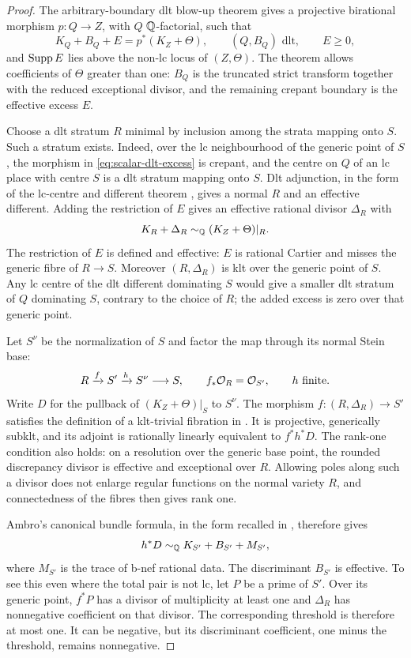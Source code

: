 \begin{proof}
The arbitrary-boundary dlt blow-up theorem
\cite[Theorem~2.10]{FujinoHashizume} gives a projective birational morphism
$p:Q\to Z$, with $Q$ $\mathbb Q$-factorial, such that
\begin{equation}\label{eq:scalar-dlt-excess}
 K_Q+B_Q+E=p^*(K_Z+\Theta),
 \qquad (Q,B_Q)\text{ dlt},\qquad E\ge0,
\end{equation}
and $\operatorname{Supp} E$ lies above the non-lc locus of $(Z,\Theta)$.
The theorem allows coefficients of $\Theta$ greater than one: $B_Q$ is
the truncated strict transform together with the reduced exceptional
divisor, and the remaining crepant boundary is the effective excess $E$.

Choose a dlt stratum $R$ minimal by inclusion among the strata mapping
onto $S$.  Such a stratum exists.  Indeed, over the lc neighbourhood of
the generic point of $S$, the morphism in
\eqref{eq:scalar-dlt-excess} is crepant, and the centre on $Q$ of an lc
place with centre $S$ is a dlt stratum mapping onto $S$.
Dlt adjunction, in the form of the lc-centre and different theorem
\cite[4.16]{Kollar2013}, gives a normal $R$ and an effective
different.  Adding the restriction of $E$ gives an effective rational
divisor $\Delta_R$ with
\[
 K_R+\Delta_R\sim_{\mathbb Q}(K_Z+\Theta)|_R.
\]
The restriction of $E$ is defined and effective: $E$ is rational Cartier
and misses the generic fibre of $R\to S$.  Moreover $(R,\Delta_R)$ is
klt over the generic point of $S$.  Any lc centre of the dlt different
dominating $S$ would give a smaller dlt stratum of $Q$ dominating $S$,
contrary to the choice of $R$; the added excess is zero over that generic
point.

Let $S^\nu$ be the normalization of $S$ and factor the map through its
normal Stein base:
\[
 R\xrightarrow{f}S'\xrightarrow{h}S^\nu\longrightarrow S,
 \qquad f_*\mathcal O_R=\mathcal O_{S'},\qquad h\text{ finite}.
\]
Write $D$ for the pullback of $(K_Z+\Theta)|_S$ to $S^\nu$.
The morphism $f:(R,\Delta_R)\to S'$ satisfies the definition of a
klt-trivial fibration in \cite[Definition~3.1]{FujinoGongyoModuli}.
It is projective, generically subklt, and its adjoint is rationally
linearly equivalent to $f^*h^*D$.  The rank-one condition also holds:
on a resolution over the generic base point, the rounded discrepancy
divisor is effective and exceptional over $R$.  Allowing poles along
such a divisor does not enlarge regular functions on the normal variety
$R$, and connectedness of the fibres then gives rank one.

Ambro's canonical bundle formula, in the form recalled in
\cite[Theorem~3.5]{FujinoGongyoModuli}, therefore gives
\begin{equation}\label{eq:scalar-cbf}
 h^*D\sim_{\mathbb Q}K_{S'}+B_{S'}+M_{S'},
\end{equation}
where $M_{S'}$ is the trace of b-nef rational data.  The discriminant
$B_{S'}$ is effective.  To see this even where the total pair is not lc,
let $P$ be a prime of $S'$.  Over its generic point, $f^*P$ has a divisor
of multiplicity at least one and $\Delta_R$ has nonnegative coefficient
on that divisor.  The corresponding threshold is therefore at most
one.  It can be negative, but its discriminant coefficient, one minus
the threshold, remains nonnegative.


\end{proof}
